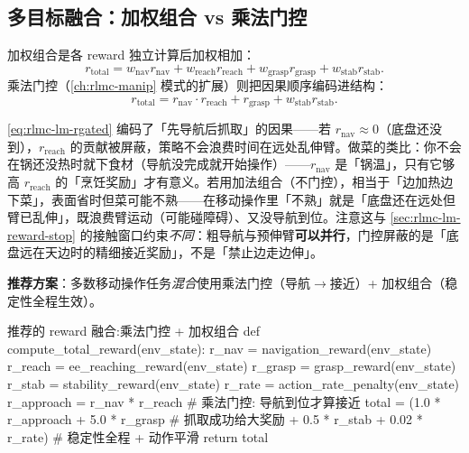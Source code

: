\subsection{多目标融合：加权组合 vs 乘法门控}
\label{sec:rlmc-lm-reward-fuse}

加权组合是各 reward 独立计算后加权相加：
\begin{equation}
r_{\text{total}} = w_{\text{nav}}r_{\text{nav}} + w_{\text{reach}}r_{\text{reach}} + w_{\text{grasp}}r_{\text{grasp}} + w_{\text{stab}}r_{\text{stab}}.
\label{eq:rlmc-lm-rweighted}
\end{equation}
乘法门控（\cref{ch:rlmc-manip} 模式的扩展）则把因果顺序编码进结构：
\begin{equation}
r_{\text{total}} = r_{\text{nav}}\cdot r_{\text{reach}} + r_{\text{grasp}} + w_{\text{stab}}r_{\text{stab}}.
\label{eq:rlmc-lm-rgated}
\end{equation}

\begin{insight}\label{ins:rlmc-lm-gate}
\cref{eq:rlmc-lm-rgated} 编码了「先导航后抓取」的因果——若 $r_{\text{nav}}\approx 0$（底盘还没到），$r_{\text{reach}}$ 的贡献被屏蔽，策略不会浪费时间在远处乱伸臂。做菜的类比：你不会在锅还没热时就下食材（导航没完成就开始操作）——$r_{\text{nav}}$ 是「锅温」，只有它够高 $r_{\text{reach}}$ 的「烹饪奖励」才有意义。若用加法组合（不门控），相当于「边加热边下菜」，表面省时但菜可能不熟——在移动操作里「不熟」就是「底盘还在远处但臂已乱伸」，既浪费臂运动（可能碰障碍）、又没导航到位。注意这与 \cref{sec:rlmc-lm-reward-stop} 的接触窗口约束\emph{不同}：粗导航与预伸臂\textbf{可以并行}，门控屏蔽的是「底盘远在天边时的精细接近奖励」，不是「禁止边走边伸」。
\end{insight}

\textbf{推荐方案}：多数移动操作任务\emph{混合}使用乘法门控（导航$\to$接近）+ 加权组合（稳定性全程生效）。

\begin{codebox}[Python]{推荐的 reward 融合:乘法门控 + 加权组合}
def compute_total_reward(env_state):
    r_nav   = navigation_reward(env_state)
    r_reach = ee_reaching_reward(env_state)
    r_grasp = grasp_reward(env_state)
    r_stab  = stability_reward(env_state)
    r_rate  = action_rate_penalty(env_state)
    r_approach = r_nav * r_reach            # 乘法门控: 导航到位才算接近
    total = (1.0 * r_approach + 5.0 * r_grasp     # 抓取成功给大奖励
             + 0.5 * r_stab + 0.02 * r_rate)      # 稳定性全程 + 动作平滑
    return total
\end{codebox}

